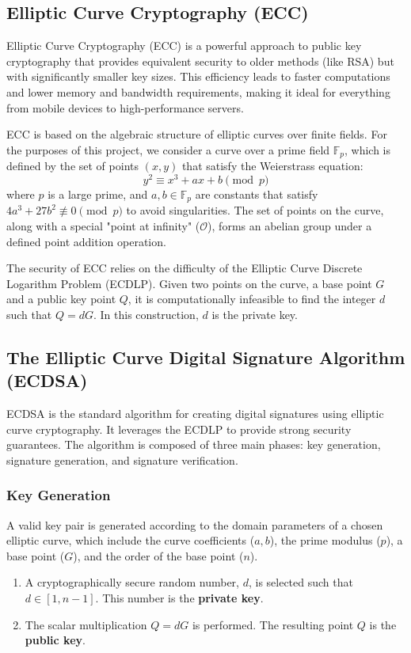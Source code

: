 \documentclass[12pt, letterpaper]{article}
\begin{document}
	\subsection{Elliptic Curve Cryptography (ECC)}
	Elliptic Curve Cryptography (ECC) is a powerful approach to public key cryptography that provides equivalent security to older methods (like RSA) but with significantly smaller key sizes. This efficiency leads to faster computations and lower memory and bandwidth requirements, making it ideal for everything from mobile devices to high-performance servers.
	
	ECC is based on the algebraic structure of elliptic curves over finite fields. For the purposes of this project, we consider a curve over a prime field $\mathbb{F}_p$, which is defined by the set of points $(x, y)$ that satisfy the Weierstrass equation:
	$$ y^2 \equiv x^3 + ax + b \pmod{p} $$
	where $p$ is a large prime, and $a, b \in \mathbb{F}_p$ are constants that satisfy $4a^3 + 27b^2 \not\equiv 0 \pmod{p}$ to avoid singularities. The set of points on the curve, along with a special "point at infinity" ($\mathcal{O}$), forms an abelian group under a defined point addition operation.
	
	The security of ECC relies on the difficulty of the Elliptic Curve Discrete Logarithm Problem (ECDLP). Given two points on the curve, a base point $G$ and a public key point $Q$, it is computationally infeasible to find the integer $d$ such that $Q = dG$. In this construction, $d$ is the private key.
	
	\subsection{The Elliptic Curve Digital Signature Algorithm (ECDSA)}
	ECDSA is the standard algorithm for creating digital signatures using elliptic curve cryptography. It leverages the ECDLP to provide strong security guarantees. The algorithm is composed of three main phases: key generation, signature generation, and signature verification.
	
	\subsubsection{Key Generation}
	A valid key pair is generated according to the domain parameters of a chosen elliptic curve, which include the curve coefficients ($a, b$), the prime modulus ($p$), a base point ($G$), and the order of the base point ($n$).
	\begin{enumerate}
		\item A cryptographically secure random number, $d$, is selected such that $d \in [1, n-1]$. This number is the \textbf{private key}.
		\item The scalar multiplication $Q = dG$ is performed. The resulting point $Q$ is the \textbf{public key}.
	\end{enumerate}
	
\end{document}
